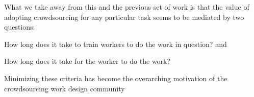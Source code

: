 \documentclass[trackingWork]{subfiles}
\begin{document}
{\begin{appendices}
    What we take away from this and the previous set of work is that
    the value of adopting crowdsourcing for any particular task
    seems to be mediated by two questions:
    \begin{inlinelist}
      \item How long does it take to train workers to do the work in question? and
      \item How long does it take for the worker to do the work?
    \end{inlinelist}
    Minimizing these criteria has become
    the overarching motivation of the crowdsourcing work design community
    \cite{cheng2015break,Newell:2016:OMA:2858036.2858490}


  \end{appendices}
}
\end{document}
